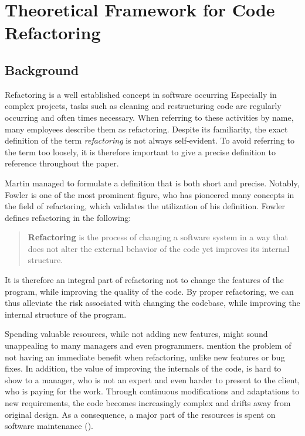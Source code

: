 \chapter{Theoretical Framework for Code Refactoring}

\section{Background}


Refactoring is a well established concept in software occurring
Especially in complex projects, 
	tasks such as cleaning and restructuring code are regularly occurring and often times necessary. 
When referring to these activities by name, many employees describe them as refactoring. 
Despite its familiarity, 
	the exact definition of the term \emph{refactoring} is not always self-evident.
To avoid referring to the term too loosely, 
	it is therefore important to give a precise definition to reference throughout the paper. 

Martin \textcite[p. ~xiv]{fowler2018} managed to formulate a definition that is both short and precise. 
Notably, Fowler is one of the most prominent figure, 
	who has pioneered many concepts in the field of refactoring,
	which validates the utilization of his definition.
Fowler defines refactoring in the following:
\begin{quote}
\textbf{Refactoring} is the process of changing a software system in a way 
	that does not alter the external behavior of the code yet improves its internal structure.
\end{quote}

It is therefore an integral part of refactoring not to change the features of the program, 
	while improving the quality of the code.
By proper refactoring, we can thus alleviate the risk associated with changing the codebase,
	while improving the internal structure of the program.





Spending valuable resources, while not adding new features, 
	might sound unappealing to many managers and even programmers.
\textcite[p.~1]{kim2012} mention the problem of not having an immediate benefit when refactoring, 
	unlike new features or bug fixes.
In addition, the value of improving the internals of the code, is hard to show to a manager, 
	who is not an expert and even harder to present to the client, who is paying for the work.
Through continuous modifications and adaptations to new requirements, the code becomes increasingly complex and drifts away from original design. 
As a consequence, 
	a major part of the resources is spent on software maintenance (\cite[p.~1]{mens2003}). 

